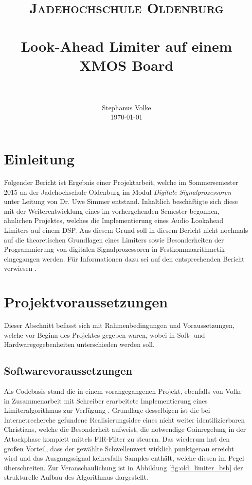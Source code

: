 \documentclass[paper=a4, fontsize=12pt]{scrartcl}
\title{
		\usefont{OT1}{bch}{b}{n}
		\normalfont \normalsize \textsc{Jadehochschule Oldenburg} \\ [25pt]
		\horrule{0.5pt} \\[0.4cm]
		\huge Look-Ahead Limiter auf einem XMOS Board \\
		\horrule{2pt} \\[0.5cm]
}
\author{
		\normalfont 								\normalsize
        Stephanus Volke\\[-3pt]		\normalsize
        \today
}
\date{}
\numberwithin{equation}{section}		%
\numberwithin{figure}{section}			%
\numberwithin{table}{section}				%
\begin{document}
\maketitle
\newpage
\section{Einleitung}
Folgender Bericht ist Ergebnis einer Projektarbeit, welche im Sommersemester 2015 an der Jadehochschule Oldenburg im Modul \textit{Digitale Signalprozessoren} unter Leitung von Dr. Uwe Simmer entstand. Inhaltlich beschäftigte sich diese mit der Weiterentwicklung eines im vorhergehenden Semester begonnen, ähnlichen Projektes, welches die Implementierung eines Audio Lookahead Limiters auf einem DSP. Aus diesem Grund soll in diesem Bericht nicht nochmals auf die theoretischen Grundlagen eines Limiters sowie Besonderheiten der Programmierung von digitalen Signalprozessoren in Festkommaarithmetik eingegangen werden. Für Informationen dazu sei auf den entsprechenden Bericht verwiesen \cite{VS15}.


\section{Projektvoraussetzungen}

Dieser Abschnitt befasst sich mit Rahmenbedingungen und Voraussetzungen, welche vor Beginn des Projektes gegeben waren, wobei in Soft- und Hardwaregegebenheiten unterschieden werden soll.

\subsection{Softwarevoraussetzungen}
Als Codebasis stand die in einem vorangegangenen Projekt, ebenfalls von Volke in Zusammenarbeit mit Schreiber erarbeitete Implementierung eines Limiteralgorithmus zur Verfügung \cite{CR00}. Grundlage desselbigen ist die bei Internetrecherche gefundene Realisierungsidee eines nicht weiter identifizierbaren Christians, welche die Besonderheit aufweist, die notwendige Gainregelung in der Attackphase komplett mittels FIR-Filter zu steuern. Das wiederum hat den großen Vorteil, dass der gewählte Schwellenwert wirklich punktgenau erreicht wird und das Ausgangssignal keinesfalls Samples enthält, welche diesen im Pegel überschreiten. Zur Veranschaulichung ist in Abbildung \ref{fig:old_limiter_bsb} der strukturelle Aufbau des Algorithmus dargestellt.
\end{document}
